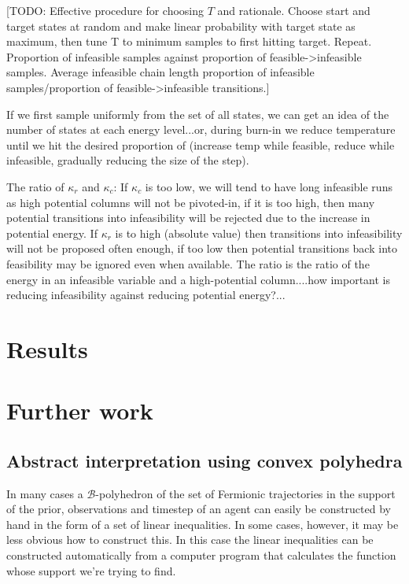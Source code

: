 \documentclass{article}
\begin{document}
[TODO: Effective procedure for choosing $T$ and rationale. Choose start and target states at random and make linear probability with target state as maximum, then tune T to minimum samples to first hitting target. Repeat.
 Proportion of infeasible samples against proportion of feasible->infeasible samples. Average infeasible chain length proportion of infeasible samples/proportion of feasible->infeasible transitions.]
 
 If we first sample uniformly from the set of all states, we can get an idea of the number of states at each energy level...or, during burn-in we reduce temperature until we hit the desired proportion of (increase temp while feasible, reduce while infeasible, gradually reducing the size of the step).
 
 The ratio of $\kappa_r$ and $\kappa_c$: If $\kappa_c$ is too low, we will tend to have long infeasible runs as high potential columns will not be pivoted-in, if it is too high, then many potential transitions into infeasibility will be rejected due to the increase in potential energy. If $\kappa_r$ is to high (absolute value) then transitions into infeasibility will not be proposed often enough, if too low then potential transitions back into feasibility may be ignored even when available. The ratio is the ratio of the energy in an infeasible variable and a high-potential column....how important is reducing infeasibility against reducing potential energy?...

\section{Results}

\section{Further work}
\subsection{Abstract interpretation using convex polyhedra}

In many cases a $\mathcal{B}$-polyhedron of the set of Fermionic trajectories in the support of the prior, observations and timestep of an agent can easily be constructed by hand in the form of a set of linear inequalities. In some cases, however, it may be less obvious how to construct this. In this case the linear inequalities can be constructed automatically from a computer program that calculates the function whose support we're trying to find.
\end{document}
